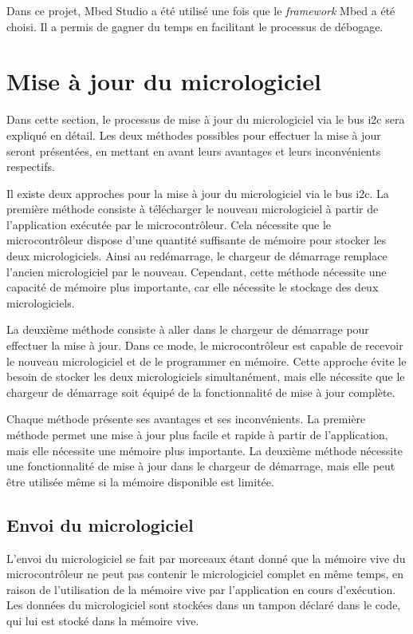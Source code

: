 Dans ce projet, Mbed Studio a été utilisé une fois que le \textit{\gls{framework}} Mbed a été choisi.
Il a permis de gagner du temps en facilitant le processus de débogage.

\section{Mise à jour du micrologiciel}

Dans cette section, le processus de mise à jour du micrologiciel via le bus \gls{i2c} sera expliqué en détail.
Les deux méthodes possibles pour effectuer la mise à jour seront présentées, en mettant en avant leurs avantages et leurs inconvénients respectifs.

Il existe deux approches pour la mise à jour du micrologiciel via le bus \gls{i2c}.
La première méthode consiste à télécharger le nouveau micrologiciel à partir de l'application exécutée par le microcontrôleur.
Cela nécessite que le microcontrôleur dispose d'une quantité suffisante de mémoire pour stocker les deux micrologiciels.
Ainsi au redémarrage, le chargeur de démarrage remplace l'ancien micrologiciel par le nouveau.
Cependant, cette méthode nécessite une capacité de mémoire plus importante, car elle nécessite le stockage des deux micrologiciels.

La deuxième méthode consiste à aller dans le chargeur de démarrage pour effectuer la mise à jour.
Dans ce mode, le microcontrôleur est capable de recevoir le nouveau micrologiciel et de le programmer en mémoire.
Cette approche évite le besoin de stocker les deux micrologiciels simultanément, mais elle nécessite que le chargeur de démarrage soit équipé de la fonctionnalité de mise à jour complète.

Chaque méthode présente ses avantages et ses inconvénients.
La première méthode permet une mise à jour plus facile et rapide à partir de l'application, mais elle nécessite une mémoire plus importante.
La deuxième méthode nécessite une fonctionnalité de mise à jour dans le chargeur de démarrage, mais elle peut être utilisée même si la mémoire disponible est limitée.

\subsection{Envoi du micrologiciel}

L'envoi du micrologiciel se fait par morceaux étant donné que la mémoire vive du microcontrôleur ne peut pas contenir le micrologiciel complet en même temps, en raison de l'utilisation de la mémoire vive par l'application en cours d'exécution.
Les données du micrologiciel sont stockées dans un tampon déclaré dans le code, qui lui est stocké dans la mémoire vive.

